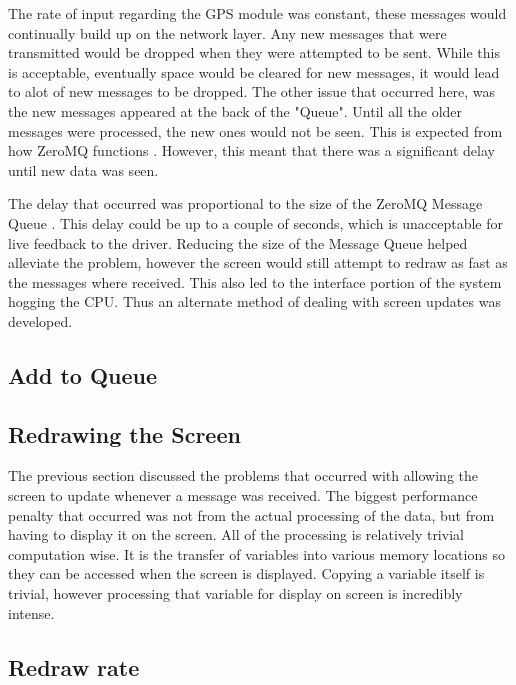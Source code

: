  The rate of input regarding the GPS module was constant, these messages would continually build up on the network layer. Any new messages that were transmitted would be dropped when they were attempted to be sent. While this is acceptable, eventually space would be cleared for new messages, it would lead to alot of new messages to be dropped. The other issue that occurred here, was the new messages appeared at the back of the "Queue". Until all the older messages were processed, the new ones would not be seen. This is expected from how ZeroMQ functions \cite{zeromq_guide}. However, this meant that there was a significant delay until new data was seen.

The delay that occurred was proportional to the size of the ZeroMQ Message Queue \cite{zeromq_guide}. This delay could be up to a couple of seconds, which is unacceptable for live feedback to the driver. Reducing the size of the Message Queue helped alleviate the problem, however the screen would still attempt to redraw as fast as the messages where received. This also led to the interface portion of the system hogging the CPU. Thus an alternate method of dealing with screen updates was developed.

\subsection{Add to Queue}



\subsection{Redrawing the Screen}

The previous section discussed the problems that occurred with allowing the screen to update whenever a message was received. The biggest performance penalty that occurred was not from the actual processing of the data, but from having to display it on the screen. All of the processing is relatively trivial computation wise. It is the transfer of variables into various memory locations so they can be accessed when the screen is displayed. Copying a variable itself is trivial, however processing that variable for display on screen is incredibly intense.

\subsection{Redraw rate}

